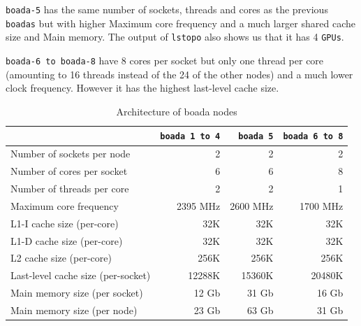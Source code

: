 \texttt{boada-5} has the same number of sockets, threads and cores as the previous \texttt{boadas} but with higher Maximum core frequency and a much larger shared cache size and Main memory.
The output of \texttt{lstopo} also shows us that it has 4 \texttt{GPUs}.

\texttt{boada-6 to boada-8} have 8 cores per socket but only one thread per core (amounting to 16 threads instead of the 24 of the other nodes) and a much lower clock frequency. However it has the
highest last-level cache size.

\begin{table}[H]%
    \centering
    \begin{tabular}{lrrr}

    \toprule
        & \texttt{boada 1 to 4} & \texttt{boada 5} & \texttt{boada 6 to 8} \\
    \midrule
        Number of sockets per node          & 2        & 2        & 2        \\
        Number of cores per socket          & 6        & 6        & 8        \\
        Number of threads per core          & 2        & 2        & 1        \\
        Maximum core frequency              & 2395 MHz & 2600 MHz & 1700 MHz \\
    \addlinespace[1em]
        L1-I cache size (per-core)          & 32K      & 32K      & 32K      \\
        L1-D cache size (per-core)          & 32K      & 32K      & 32K      \\
        L2 cache size (per-core)            & 256K     & 256K     & 256K     \\
        Last-level cache size (per-socket)  & 12288K   & 15360K   & 20480K   \\
    \addlinespace[1em]
        Main memory size (per socket)       & 12 Gb    & 31 Gb    & 16 Gb    \\
        Main memory size (per node)         & 23 Gb    & 63 Gb    & 31 Gb    \\
    \bottomrule

    \end{tabular}
    
    \caption{Architecture of boada nodes}%
    \label{tab:node_arch_and_mem}
\end{table}



